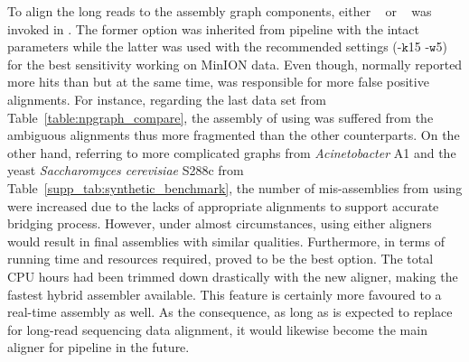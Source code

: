 To align the long reads to the assembly graph components, either \bwa{}~\cite{Li2013} or \minimap{}~\cite{Li2016} was invoked in \npgraph{}. 
The former option was inherited from \npscarf{} pipeline with the intact parameters
while the latter was used with the recommended settings (-$\mathtt{k}$15 -$\mathtt{w}$5) for the best sensitivity working on MinION data.
Even though, \bwa{} normally reported more hits than \minimap{} but at the same time, was responsible for more false positive alignments.
For instance, regarding the last data set from Table~\ref{table:npgraph_compare}, the assembly of \npgraph{} using \bwa{} was suffered from the ambiguous alignments thus more fragmented than the other counterparts. 
On the other hand, referring to more complicated graphs from \emph{Acinetobacter} A1 and the yeast \emph{Saccharomyces cerevisiae} S288c from Table~\ref{supp_tab:synthetic_benchmark}, the number of mis-assemblies from using \minimap{} were increased due to the lacks of appropriate alignments to support accurate bridging process.
However, under almost circumstances, using either aligners would result in final assemblies with similar qualities.
Furthermore, in terms of running time and resources required, \minimap{} proved to be the best option. 
The total CPU hours had been trimmed down drastically with the new aligner, making \npgraph{} the fastest hybrid assembler available.
This feature is certainly more favoured to a real-time assembly as well.
As the consequence, as long as \minimap{} is expected to replace \bwa{} for long-read sequencing data alignment, it would likewise become the main aligner for \npgraph{} pipeline in the future.

